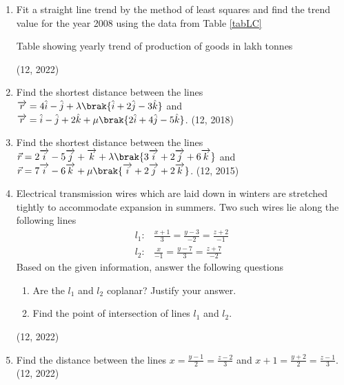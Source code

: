 \begin{enumerate}[label=\thesubsection.\arabic*,ref=\thesubsection.\theenumi]
\item Fit a straight line trend by the method of least squares and find the trend value for the year 2008 using the data from Table \ref{tabLC}
	\begin{table}[H]
		\caption{Table showing yearly trend of production of goods in lakh tonnes \label{tabLC}}
		
	\end{table}
\hfill (12, 2022)
\item Find the shortest distance between the lines 
	$\overrightarrow{r} = 4\hat{i} - \hat{j} + \lambda \brak{\hat{i} + 2\hat{j} - 3\hat{k}}$ 
and
		$\overrightarrow{r}= \hat{i} - \hat{j} + 2\hat{k} + \mu \brak{2\hat{i} + 4\hat{j} - 5\hat{k}}$.
\hfill (12, 2018)
\item Find the shortest distance between the lines
$\vec{r} = 2\overrightarrow{i}-5\overrightarrow{j}+\overrightarrow{k} +\lambda\brak{3\overrightarrow{i}+2\overrightarrow{j}+6\overrightarrow{k}}$ and $\vec{r} = 7\overrightarrow{i}-6\overrightarrow{k}+\mu\brak{\overrightarrow{i}+2\overrightarrow{j}+2\overrightarrow{k}}$. \hfill (12, 2015)
\item Electrical transmission wires which are laid down in winters are stretched tightly to accommodate expansion in summers.
	Two such wires  lie along the following lines
	\begin{align*}
		l_1: & \frac{x+1}{3}=\frac{y-3}{-2}=\frac{z+2}{-1}\\
		l_2: & \frac{x}{-1}=\frac{y-7}{3}=\frac{z+7}{-2}
	\end{align*}
	Based on the given information, answer the following questions
	\begin{enumerate}
		\item	Are the $l_1$ and $l_2$ coplanar? Justify your answer.
		\item    Find the point of intersection of lines $l_1$ and $l_2$.
	\end{enumerate}
\hfill (12, 2022)
\item Find the distance between the lines $x=\frac{y-1}{2}=\frac{z-2}{3}$ and $x+1=\frac{y+2}{2}=\frac{z-1}{3}$. \hfill (12, 2022)


\end{enumerate}
